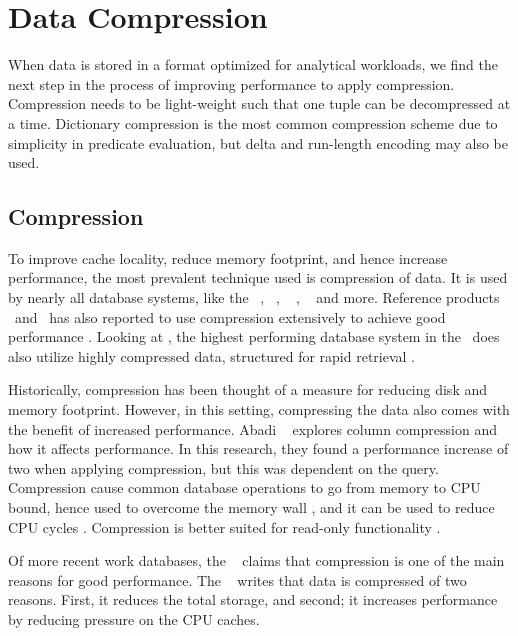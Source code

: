 \chapter{Data Compression}
\label{chap:Data Compression}
When data is stored in a format optimized for analytical workloads, we find the next step in the process of improving performance to apply compression. Compression needs to be light-weight such that one tuple can be decompressed at a time. Dictionary compression is the most common compression scheme due to simplicity in predicate evaluation, but delta and run-length encoding may also be used.
\newpage

\section{Compression}
\label{sec:Compression}
To improve cache locality, reduce memory footprint, and hence increase performance, the most prevalent technique used is compression of data. It is used by nearly all database systems, like the \ibm~\cite{Raman2013-em}, \cstore~\cite{Stonebraker2005-qz}, ~ \cite{Lamb2012-kg}, \oracle~\cite{Oracle2015-fs} and more. Reference products \tableau~and \qlikview~has also reported to use compression extensively to achieve good performance \cite{Kamkolkar2015-iq, Qlik2014-vd}. Looking at \exasol, the highest performing database system in the \tpch~does also utilize highly compressed data, structured for rapid retrieval \cite{Exasol2014-xh}. 

Historically, compression has been thought of a measure for reducing disk and memory footprint. However, in this setting, compressing the data also comes with the benefit of increased performance. Abadi \ea~\cite{Abadi2008-dd} explores column compression and how it affects performance. In this research, they found a performance increase of two when applying compression, but this was dependent on the query. Compression cause common database operations to go from memory to CPU bound, hence used to overcome the memory wall \cite{Willhalm2009-hu}, and it can be used to reduce CPU cycles \cite{Stonebraker2005-qz}. Compression is better suited for read-only functionality \cite{Westmann2000-mz}.

Of more recent work databases, the \gorilla~\cite{Pelkonen2015-ko} claims that compression is one of the main reasons for good performance. The \exasol~\cite{Exasol2014-xh} writes that data is compressed of two reasons. First, it reduces the total storage, and second; it increases performance by reducing pressure on the CPU caches. 

